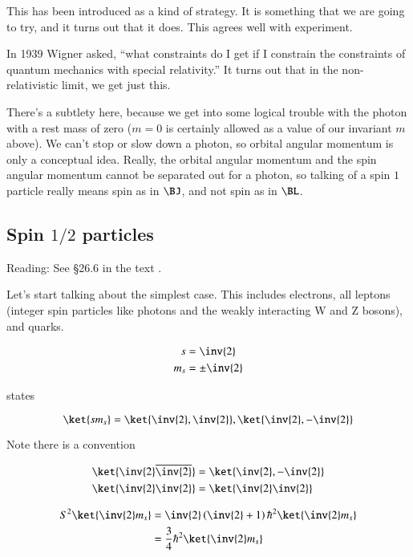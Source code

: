 This has been introduced as a kind of strategy.  It is something that we are going to try, and it turns out that it does.  This agrees well with experiment.

In 1939 Wigner asked, ``what constraints do I get if I constrain the constraints of quantum mechanics with special relativity.''  It turns out that in the non-relativistic limit, we get just this.

There's a subtlety here, because we get into some logical trouble with the photon with a rest mass of zero ($m = 0$ is certainly allowed as a value of our invariant $m$ above).  We can't stop or slow down a photon, so orbital angular momentum is only a conceptual idea.  Really, the orbital angular momentum and the spin angular momentum cannot be separated out for a photon, so talking of a spin $1$ particle really means spin as in $\BJ$, and not spin as in $\BL$.

\subsection{Spin $1/2$ particles}

Reading: See \S 26.6 in the text \cite{desai2009quantum}.

Let's start talking about the simplest case.  This includes electrons, all leptons (integer spin particles like photons and the weakly interacting W and Z bosons), and quarks.

\begin{align}\label{eqn:qmTwoL13:410}
s &= \inv{2} \\
m_s &= \pm \inv{2}
\end{align}

states

\begin{equation}\label{eqn:qmTwoL13:430}
\ket{s m_s} = \ket{ \inv{2}, \inv{2} },\ket{ \inv{2}, -\inv{2} }
\end{equation}

Note there is a convention

\begin{align}\label{eqn:qmTwoL13:450}
\ket{ \inv{2} \overline{\inv{2}} } &= \ket{ \inv{2}, -\inv{2} } \\
\ket{ \inv{2} \inv{2} } &= \ket{ \inv{2} \inv{2} }
\end{align}

\begin{equation}\label{eqn:qmTwoL13:470}
\begin{aligned}
S^2 
\ket{\inv{2} m_s} 
&= 
\inv{2} \left( \inv{2} + 1 \right) \hbar^2 
\ket{\inv{2} m_s}  \\
&=
\frac{3}{4} \hbar^2 \ket{\inv{2} m_s}  \\
\end{aligned}
\end{equation}

